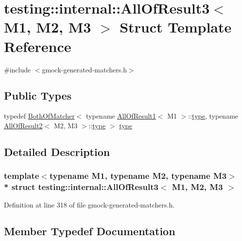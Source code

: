 \hypertarget{structtesting_1_1internal_1_1_all_of_result3}{}\section{testing\+:\+:internal\+:\+:All\+Of\+Result3$<$ M1, M2, M3 $>$ Struct Template Reference}
\label{structtesting_1_1internal_1_1_all_of_result3}


{\ttfamily \#include $<$gmock-\/generated-\/matchers.\+h$>$}

\subsection*{Public Types}
\begin{DoxyCompactItemize}
\item 
typedef \hyperlink{classtesting_1_1internal_1_1_both_of_matcher}{Both\+Of\+Matcher}$<$ typename \hyperlink{structtesting_1_1internal_1_1_all_of_result1}{All\+Of\+Result1}$<$ M1 $>$\+::\hyperlink{structtesting_1_1internal_1_1_all_of_result3_a18073a23acd542bccf3a6c5d7f72f957}{type}, typename \hyperlink{structtesting_1_1internal_1_1_all_of_result2}{All\+Of\+Result2}$<$ M2, M3 $>$\+::\hyperlink{structtesting_1_1internal_1_1_all_of_result3_a18073a23acd542bccf3a6c5d7f72f957}{type} $>$ \hyperlink{structtesting_1_1internal_1_1_all_of_result3_a18073a23acd542bccf3a6c5d7f72f957}{type}
\end{DoxyCompactItemize}


\subsection{Detailed Description}
\subsubsection*{template$<$typename M1, typename M2, typename M3$>$\\*
struct testing\+::internal\+::\+All\+Of\+Result3$<$ M1, M2, M3 $>$}



Definition at line 318 of file gmock-\/generated-\/matchers.\+h.



\subsection{Member Typedef Documentation}
